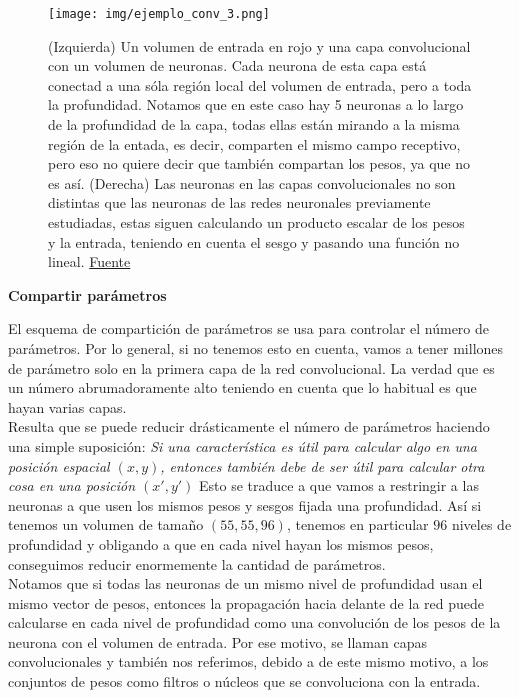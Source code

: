         \begin{figure}[H]
            \centering
            \texttt{[image: img/ejemplo\_conv\_3.png]}
            \caption{(Izquierda) Un volumen de entrada en rojo y una capa convolucional con un volumen de neuronas. Cada neurona de esta capa está conectad a una sóla región local del volumen de entrada, pero a toda la profundidad. Notamos que en este caso hay 5 neuronas a lo largo de la profundidad de la capa, todas ellas están mirando a la misma región de la entada, es decir, comparten el mismo campo receptivo, pero eso no quiere decir que también compartan los pesos, ya que no es así. (Derecha) Las neuronas en las capas convolucionales no son distintas que las neuronas de las redes neuronales previamente estudiadas, estas siguen calculando un producto escalar de los pesos y la entrada, teniendo en cuenta el sesgo y pasando una función no lineal. \href{https://cs231n.github.io/convolutional-networks/}{Fuente}}
            \label{fig:ejemplo_conv_3}
        \end{figure}
        
        
        
        
        
        \begin{center}
            \textbf{Compartir parámetros}
        \end{center}
        
        El esquema de compartición de parámetros se usa para controlar el número de parámetros. Por lo general, si no tenemos esto en cuenta, vamos a tener millones de parámetro solo en la primera capa de la red convolucional. La verdad que es un número abrumadoramente alto teniendo en cuenta que lo habitual es que hayan varias capas. \\
        
        Resulta que se puede reducir drásticamente el número de parámetros haciendo una simple suposición: \textit{Si una característica es útil para calcular algo en una posición espacial $(x,y)$, entonces también debe de ser útil para calcular otra cosa en una posición $(x',y')$} Esto se traduce a que vamos a restringir a las neuronas a que usen los mismos pesos y sesgos fijada una profundidad. Así si tenemos un volumen de tamaño $(55,55,96)$, tenemos en particular $96$ niveles de profundidad y obligando a que en cada nivel hayan los mismos pesos, conseguimos reducir enormemente la cantidad de parámetros. \\
        
        Notamos que si todas las neuronas de un mismo nivel de profundidad usan el mismo vector de pesos, entonces la propagación hacia delante de la red puede calcularse en cada nivel de profundidad como una convolución de los pesos de la neurona con el volumen de entrada. Por ese motivo, se llaman capas convolucionales y también nos referimos, debido a de este mismo motivo, a los conjuntos de pesos como filtros o núcleos que se convoluciona con la entrada.\\
        
